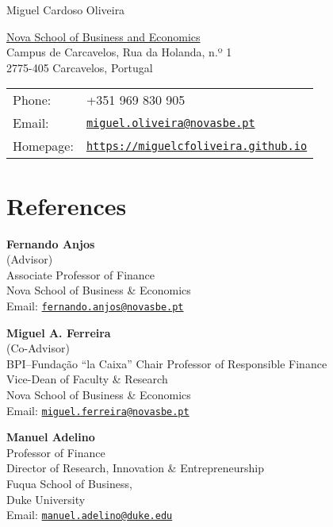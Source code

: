 \documentclass[letterpaper]{article}
\def\name{Miguel Cardoso Oliveira}
\begin{document}
\begin{center}
{\huge \name}
\end{center}

\vspace{0.1in}

\begin{minipage}{0.45\linewidth}
  \href{https://www.novasbe.unl.pt/en/}{Nova School of Business and Economics} \\
  Campus de Carcavelos, Rua da Holanda, n.º 1 \\ 
  2775-405 Carcavelos, Portugal 
\end{minipage}
\begin{minipage}{0.45\linewidth}
  \begin{tabular}{ll}
    Phone: & +351 969 830 905 \\
    Email: & \href{mailto:miguel.oliveira@novasbe.pt}{\tt miguel.oliveira@novasbe.pt} \\
    Homepage: & \href{https://miguelcfoliveira.github.io}{\tt https://miguelcfoliveira.github.io} 
  \end{tabular}
\end{minipage}


\section*{References}
\vspace{-0.2in}
\hrulefill
\begin{multicols}{2}
\textbf{Fernando Anjos} \\
(Advisor) \\
Associate Professor of Finance \\
Nova School of Business \& Economics \\
Email: \href{mailto:fernando.anjos@novasbe.pt}{\tt fernando.anjos@novasbe.pt} 
\columnbreak \hfill

\textbf{Miguel A. Ferreira} \\
(Co-Advisor) \\
BPI--Fundação “la Caixa” Chair Professor of Responsible Finance \\ 
Vice-Dean of Faculty \& Research \\
Nova School of Business \& Economics \\
Email: \href{mailto:miguel.ferreira@novasbe.pt}{\tt miguel.ferreira@novasbe.pt} 
\end{multicols}

\begin{multicols}{2}
\textbf{Manuel Adelino} \\
Professor of Finance \\
Director of Research, Innovation \& Entrepreneurship \\
Fuqua School of Business, \\ 
Duke University \\
Email: \href{mailto:manuel.adelino@duke.edu}{\tt manuel.adelino@duke.edu} 
\columnbreak \hfill

\phantom{a}
\end{multicols}
\end{document}
